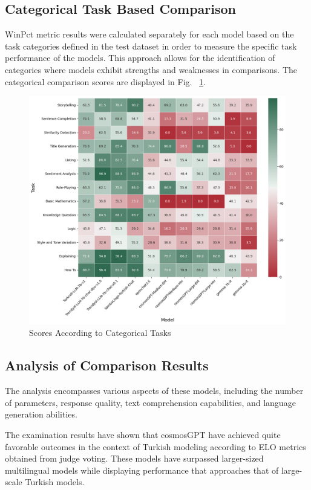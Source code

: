 \documentclass[conference]{IEEEtran}
\begin{document}
\subsection{Categorical Task Based Comparison}

WinPct metric results were calculated separately for each model based on the task categories defined in the test dataset in order to measure the specific task performance of the models. This approach allows for the identification of categories where models exhibit strengths and weaknesses in comparisons. The categorical comparison scores are displayed in Fig. ~\ref{tasks_models}.

\begin{figure}[htbp] %
\centerline{\includegraphics[scale=0.4]{tasks_and_models.png}}
\caption{Scores According to Categorical Tasks}
\label{tasks_models}
\end{figure}


\subsection{Analysis of Comparison Results}

The analysis encompasses various aspects of these models, including the number of parameters, response quality, text comprehension capabilities, and language generation abilities.

The examination results have shown that cosmosGPT have achieved quite favorable outcomes in the context of Turkish modeling according to ELO metrics obtained from judge voting. These models have surpassed larger-sized multilingual models while displaying performance that approaches that of large-scale Turkish models.
\end{document}
